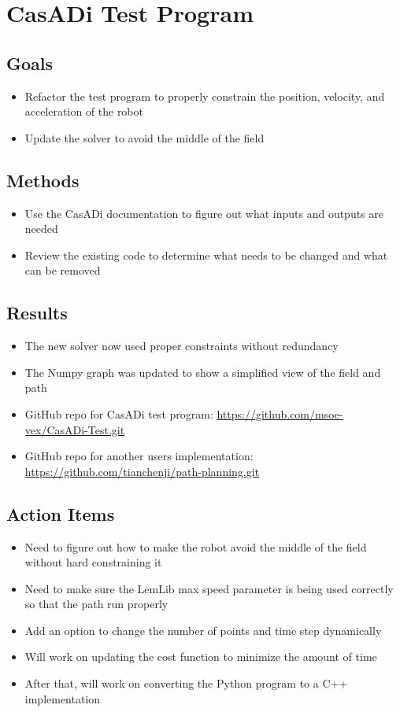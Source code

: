 \section{CasADi Test Program}

\subsection{Goals}
\begin{itemize}
    \item Refactor the test program to properly constrain the position, velocity, and acceleration of the robot
    \item Update the solver to avoid the middle of the field
\end{itemize}

\subsection{Methods}
\begin{itemize}
    \item Use the CasADi documentation to figure out what inputs and outputs are needed
    \item Review the existing code to determine what needs to be changed and what can be removed
\end{itemize}

\subsection{Results}
\begin{itemize}
    \item The new solver now used proper constraints without redundancy
    \item The Numpy graph was updated to show a simplified view of the field and path
    \item GitHub repo for CasADi test program: \href{https://github.com/msoe-vex/CasADi-Test.git}{https://github.com/msoe-vex/CasADi-Test.git}
    \item GitHub repo for another users implementation: \href{https://github.com/tianchenji/path-planning.git}{https://github.com/tianchenji/path-planning.git}
\end{itemize}

\subsection{Action Items}
\begin{itemize}
    \item Need to figure out how to make the robot avoid the middle of the field without hard constraining it
    \item Need to make sure the LemLib max speed parameter is being used correctly so that the path run properly
    \item Add an option to change the number of points and time step dynamically
    \item Will work on updating the cost function to minimize the amount of time
    \item After that, will work on converting the Python program to a C++ implementation
\end{itemize}